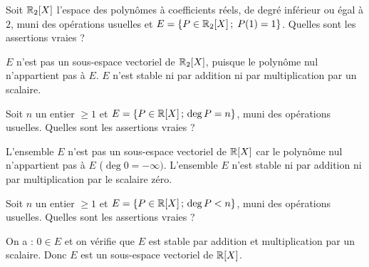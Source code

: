 \begin{question}
Soit $\mathbb{R}_2[X]$ l'espace des polynômes à coefficients réels, de degré inférieur ou égal à $2$, muni des opérations usuelles et 
$E=\{P \in \mathbb{R}_2[X] \, ; \; P(1)=1\}$. Quelles sont les assertions vraies ?
\begin{answers}  
\end{answers}
\begin{explanations} $E$ n'est pas un sous-espace vectoriel de $\mathbb{R}_2[X]$, puisque le polynôme nul n'appartient pas à $ E$.  
$E$ n'est stable ni par addition ni par multiplication par un scalaire.
\end{explanations}
\end{question}


\begin{question}
Soit $n$ un entier $\ge 1$ et  $E=\{P \in \mathbb{R}[X] \, ; \, \deg P=n\}$, muni des opérations usuelles. Quelles sont les assertions vraies ?
\begin{answers}  
\end{answers}
\begin{explanations} L'ensemble $E$ n'est pas un sous-espace vectoriel de $\mathbb{R}[X]$ car le polynôme nul n'appartient pas à $E$ ($\deg 0=-\infty)$. L'ensemble $E$ n'est stable ni par addition ni par multiplication par le scalaire zéro.
\end{explanations}
\end{question}


\begin{question}
Soit $n$ un entier $\ge 1$ et  $E=\{P \in \mathbb{R}[X] \, ; \, \deg P< n\}$, muni des opérations usuelles. Quelles sont les assertions vraies ?
\begin{answers}  
\end{answers}
\begin{explanations} On a : $0\in E$ et on vérifie que $E$ est stable par addition et multiplication par un scalaire. Donc $E$ est un sous-espace vectoriel de $\mathbb{R}[X]$.
\end{explanations}
\end{question}



